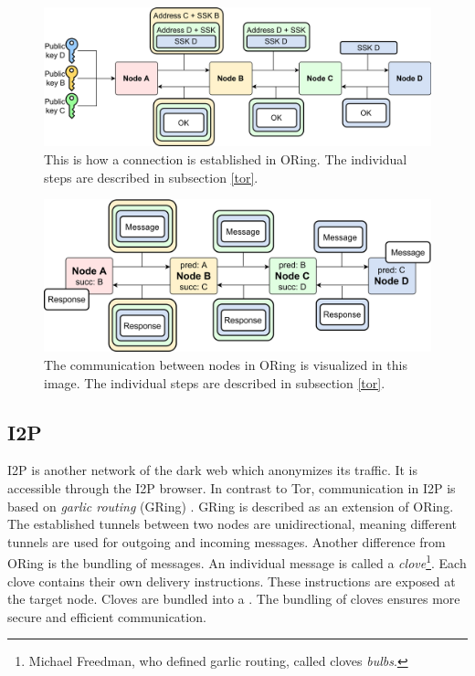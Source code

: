 \begin{figure}
  \centering
  \includegraphics[width = \textwidth]{Images/OREstablishment.png}
  \caption{This is how a connection is established in ORing. The individual steps are described in subsection \ref{tor}.}
  \label{OREstablishment}
\end{figure}

\begin{figure}
  \centering
  \includegraphics[width = \textwidth]{Images/ORCom.png}
  \caption{The communication between nodes in ORing is visualized in this image. The individual steps are described in subsection \ref{tor}.}
  \label{ORCom}
\end{figure}

\subsection{I2P} \label{I2P}
I2P \cite{i2pIntro} is another network of the dark web which anonymizes its traffic. It is accessible through the I2P browser. In contrast to Tor, communication in I2P is based on \textit{garlic routing} (GRing) \cite{garlicRouting}. GRing is described as an extension of ORing. The established tunnels between two nodes are unidirectional, meaning different tunnels are used for outgoing and incoming messages. Another difference from ORing is the bundling of messages. An individual message is called a \textit{clove}\footnote{Michael Freedman, who defined garlic routing, called cloves \textit{bulbs}.}. Each clove contains their own delivery instructions. These instructions are exposed at the target node. Cloves are bundled into a . The bundling of cloves ensures more secure and efficient communication. 

